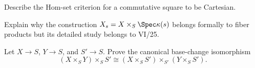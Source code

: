 \begin{exercise}\label{exr:vi23-24}
Describe the Hom-set criterion for a commutative square to be Cartesian.
\end{exercise}

\begin{exercise}\label{exr:vi23-25}
Explain why the construction $X_s=X\times_S\Spec\kappa(s)$ belongs formally to fiber products but its detailed study belongs to VI/25.
\end{exercise}

\begin{exercise}\label{exr:vi23-26}
Let \(X\to S\), \(Y\to S\), and \(S'\to S\). Prove the canonical base-change isomorphism
\[
(X\times_S Y)\times_S S'
\cong
(X\times_S S')\times_{S'}(Y\times_S S').
\]
\end{exercise}
